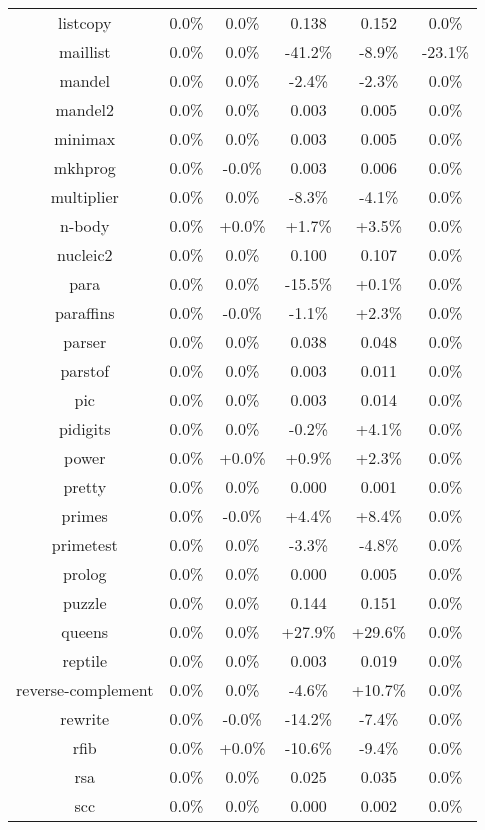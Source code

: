 \begin{tabular}{ c c c c c c }
listcopy &  0.0\% &  0.0\% & 0.138 & 0.152 &  0.0\%\\
maillist &  0.0\% &  0.0\% & -41.2\% & -8.9\% & -23.1\%\\
mandel &  0.0\% &  0.0\% & -2.4\% & -2.3\% &  0.0\%\\
mandel2 &  0.0\% &  0.0\% & 0.003 & 0.005 &  0.0\%\\
minimax &  0.0\% &  0.0\% & 0.003 & 0.005 &  0.0\%\\
mkhprog &  0.0\% & -0.0\% & 0.003 & 0.006 &  0.0\%\\
multiplier &  0.0\% &  0.0\% & -8.3\% & -4.1\% &  0.0\%\\
n-body &  0.0\% & +0.0\% & +1.7\% & +3.5\% &  0.0\%\\
nucleic2 &  0.0\% &  0.0\% & 0.100 & 0.107 &  0.0\%\\
para &  0.0\% &  0.0\% & -15.5\% & +0.1\% &  0.0\%\\
paraffins &  0.0\% & -0.0\% & -1.1\% & +2.3\% &  0.0\%\\
parser &  0.0\% &  0.0\% & 0.038 & 0.048 &  0.0\%\\
parstof &  0.0\% &  0.0\% & 0.003 & 0.011 &  0.0\%\\
pic &  0.0\% &  0.0\% & 0.003 & 0.014 &  0.0\%\\
pidigits &  0.0\% &  0.0\% & -0.2\% & +4.1\% &  0.0\%\\
power &  0.0\% & +0.0\% & +0.9\% & +2.3\% &  0.0\%\\
pretty &  0.0\% &  0.0\% & 0.000 & 0.001 &  0.0\%\\
primes &  0.0\% & -0.0\% & +4.4\% & +8.4\% &  0.0\%\\
primetest &  0.0\% &  0.0\% & -3.3\% & -4.8\% &  0.0\%\\
prolog &  0.0\% &  0.0\% & 0.000 & 0.005 &  0.0\%\\
puzzle &  0.0\% &  0.0\% & 0.144 & 0.151 &  0.0\%\\
queens &  0.0\% &  0.0\% & +27.9\% & +29.6\% &  0.0\%\\
reptile &  0.0\% &  0.0\% & 0.003 & 0.019 &  0.0\%\\
reverse-complement &  0.0\% &  0.0\% & -4.6\% & +10.7\% &  0.0\%\\
rewrite &  0.0\% & -0.0\% & -14.2\% & -7.4\% &  0.0\%\\
rfib &  0.0\% & +0.0\% & -10.6\% & -9.4\% &  0.0\%\\
rsa &  0.0\% &  0.0\% & 0.025 & 0.035 &  0.0\%\\
scc &  0.0\% &  0.0\% & 0.000 & 0.002 &  0.0\%\\

\end{tabular}
